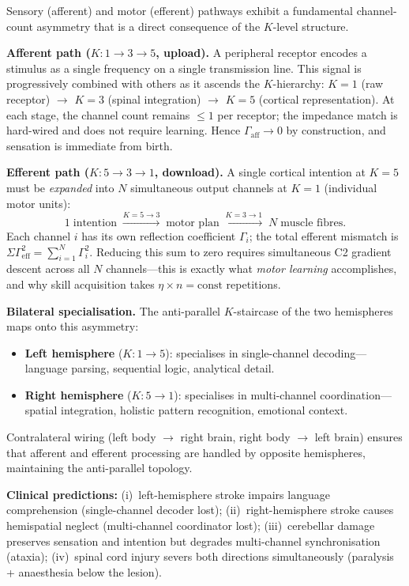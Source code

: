 \documentclass[aps,pre,twocolumn,superscriptaddress,floatfix]{revtex4-2}
\begin{document}
\begin{remark}
\label{rem:afferent-efferent-asymmetry}
Sensory (afferent) and motor (efferent) pathways
exhibit a fundamental channel-count asymmetry that
is a direct consequence of the $K$-level structure.

\textbf{Afferent path ($K\!: 1 \to 3 \to 5$, upload).}
A peripheral receptor encodes a stimulus as a single
frequency on a single transmission line.
This signal is progressively combined with others
as it ascends the $K$-hierarchy:
$K = 1$ (raw receptor) $\to$ $K = 3$ (spinal
integration) $\to$ $K = 5$ (cortical
representation).
At each stage, the channel count remains $\leq 1$
per receptor;
the impedance match is hard-wired and does not
require learning.
Hence $\Gamma_{\mathrm{aff}} \to 0$ by construction,
and sensation is immediate from birth.

\textbf{Efferent path ($K\!: 5 \to 3 \to 1$, download).}
A single cortical intention at $K = 5$ must be
\emph{expanded} into $N$ simultaneous output channels
at $K = 1$ (individual motor units):
\[
  1 \;\text{intention} \;\xrightarrow{K=5 \to 3}
  \;\text{motor plan}
  \;\xrightarrow{K=3 \to 1}
  \;N \;\text{muscle fibres.}
\]
Each channel $i$ has its own reflection coefficient
$\Gamma_i$;
the total efferent mismatch is
$\Sigma\Gamma^2_{\mathrm{eff}} =
\sum_{i=1}^{N} \Gamma_i^2$.
Reducing this sum to zero requires simultaneous
C2 gradient descent across all $N$ channels---this
is exactly what \emph{motor learning} accomplishes,
and why skill acquisition takes
$\eta \times n = \text{const}$ repetitions.

\textbf{Bilateral specialisation.}
The anti-parallel $K$-staircase of the two
hemispheres maps onto this asymmetry:
\begin{itemize}
  \item \textbf{Left hemisphere} ($K\!: 1 \to 5$):
    specialises in single-channel decoding---language
    parsing, sequential logic, analytical detail.
  \item \textbf{Right hemisphere} ($K\!: 5 \to 1$):
    specialises in multi-channel coordination---spatial
    integration, holistic pattern recognition,
    emotional context.
\end{itemize}
Contralateral wiring (left body $\to$ right brain,
right body $\to$ left brain) ensures that afferent
and efferent processing are handled by opposite
hemispheres, maintaining the anti-parallel topology.

\textbf{Clinical predictions:}
(i)~left-hemisphere stroke impairs language
comprehension (single-channel decoder lost);
(ii)~right-hemisphere stroke causes hemispatial
neglect (multi-channel coordinator lost);
(iii)~cerebellar damage preserves sensation and
intention but degrades multi-channel
synchronisation (ataxia);
(iv)~spinal cord injury severs both directions
simultaneously (paralysis + anaesthesia below
the lesion).
\end{remark}
\end{document}
